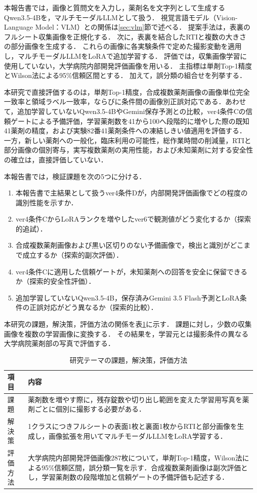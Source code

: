 \documentclass[uplatex,dvipdfmx]{jsarticle}
\begin{document}
本報告書では，画像と質問文を入力し，薬剤名を文字列として生成するQwen3.5-4Bを，マルチモーダルLLMとして扱う．
視覚言語モデル（Vision-Language Model：VLM）との関係は\ref{sec:vlm}節で述べる．
提案手法は，表裏のフルシート収集画像を正規化する．
次に，表裏を結合したRTIと複数の大きさの部分画像を生成する．
これらの画像に各実験条件で定めた撮影変動を適用し，マルチモーダルLLMをLoRAで追加学習する．
評価では，収集画像学習に使用していない，大学病院内部開発評価画像を用いる．
主指標は単剤Top-1精度とWilson法による95\%信頼区間とする．
加えて，誤分類の組合せを列挙する．

本研究で直接評価するのは，単剤Top-1精度，合成複数薬剤画像の画像単位完全一致率と領域ラベル一致率，ならびに条件間の画像別正誤対応である．あわせて，追加学習していないQwen3.5-4BやGemini保存予測との比較，ver4条件Cの信頼ゲートによる予備評価，学習薬剤数を41から100へ段階的に増やした際の既知41薬剤の精度，および実験82番41薬剤条件への凍結しきい値適用を評価する．
一方，新しい薬剤への一般化，臨床利用の可能性，総作業時間の削減量，RTIと部分画像の個別寄与，実写複数薬剤の実用性能，および未知薬剤に対する安全性の確立は，直接評価していない．

本報告書では，検証課題を次の5つに分ける．
\begin{enumerate}
  \item 本報告書で主結果として扱うver4条件Dが，内部開発評価画像でどの程度の識別性能を示すか．
  \item ver4条件CからLoRAランクを増やしたver6で観測値がどう変化するか（探索的追試）．
  \item 合成複数薬剤画像および黒い区切りのない予備画像で，検出と識別がどこまで成立するか（探索的副次評価）．
  \item ver4条件Cに適用した信頼ゲートが，未知薬剤への回答を安全に保留できるか（探索的安全性評価）．
  \item 追加学習していないQwen3.5-4B，保存済みGemini 3.5 Flash予測とLoRA条件の正誤対応がどう異なるか（探索的比較）．
\end{enumerate}

本研究の課題，解決策，評価方法の関係を表\ref{tab:research_summary}に示す．
課題に対し，少数の収集画像を複数の学習画像に変換する．
その結果を，学習元とは撮影条件の異なる大学病院薬剤部の写真で評価する．

\begin{table}[htbp]
  \centering
  \caption{研究テーマの課題，解決策，評価方法}
  \label{tab:research_summary}
  \small
  \begin{tabular}{|p{2.0cm}|p{10.5cm}|}
    \hline
    項目 & 内容 \\ \hline
    課題 & 薬剤数を増やす際に，残存錠数や切り出し範囲を変えた学習用写真を薬剤ごとに個別に撮影する必要がある． \\ \hline
    解決策 & 1クラスにつきフルシートの表面1枚と裏面1枚からRTIと部分画像を生成し，画像拡張を用いてマルチモーダルLLMをLoRA学習する． \\ \hline
    評価方法 & 大学病院内部開発評価画像287枚について，単剤Top-1精度，Wilson法による95\%信頼区間，誤分類一覧を示す．合成複数薬剤画像は副次評価とし，学習薬剤数の段階増加と信頼ゲートの予備評価も記述する． \\ \hline
  \end{tabular}
\end{table}
\end{document}
